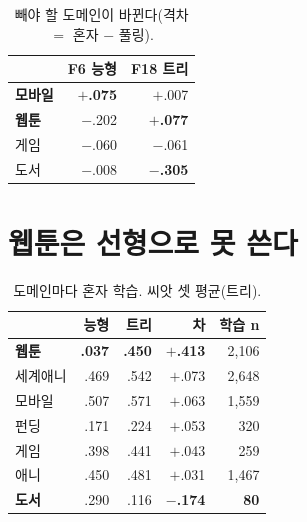 \documentclass[10pt]{article}
\begin{document}

\begin{table}[t]
\centering\tsize
\caption{빼야 할 도메인이 바뀐다(격차 $=$ 혼자 $-$ 풀링).}
\begin{tabular}{lrr}
\toprule
& F6 능형 & F18 트리 \\
\midrule
\textbf{모바일} & \textbf{$+$.075} & $+$.007 \\
\textbf{웹툰} & $-$.202 & \textbf{$+$.077} \\
게임 & $-$.060 & $-$.061 \\
도서 & $-$.008 & \textbf{$-$.305} \\
\bottomrule
\end{tabular}
\end{table}


\section{웹툰은 선형으로 못 쓴다}

\begin{table}[t]
\centering\tsize
\caption{도메인마다 혼자 학습. 씨앗 셋 평균(트리).}
\begin{tabular}{lrrrr}
\toprule
& 능형 & 트리 & 차 & 학습 n \\
\midrule
\textbf{웹툰} & \textbf{.037} & \textbf{.450} & \textbf{$+$.413} & 2{,}106 \\
세계애니 & .469 & .542 & $+$.073 & 2{,}648 \\
모바일 & .507 & .571 & $+$.063 & 1{,}559 \\
펀딩 & .171 & .224 & $+$.053 & 320 \\
게임 & .398 & .441 & $+$.043 & 259 \\
애니 & .450 & .481 & $+$.031 & 1{,}467 \\
\textbf{도서} & .290 & .116 & \textbf{$-$.174} & \textbf{80} \\
\bottomrule
\end{tabular}
\end{table}
\end{document}
